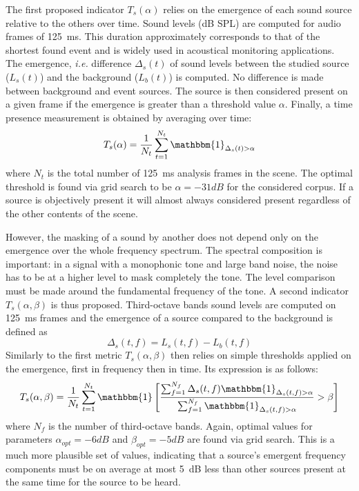 \documentclass{article}
\begin{document}
\begin{sloppy}
The first proposed indicator $T_s(\alpha)$ relies on the emergence of each sound source relative to the others over time. Sound levels (dB SPL) are computed for audio frames of 125~ms. This duration approximately corresponds to that of the shortest found event and is widely used in acoustical monitoring applications. The emergence, \textit{i.e.} difference $\Delta_s(t)$ of sound levels between the studied source ($L_s(t)$) and the background ($L_b(t)$) is computed. No difference is made between background and event sources. The source is then considered present on a given frame if the emergence is greater than a threshold value $\alpha$. Finally, a time presence measurement is obtained by averaging over time:
\begin{equation}
T_s(\alpha) = \frac{1}{N_t}\sum_{t = 1}^{N_t}\mathbbm{1}_{\Delta_s(t)>\alpha}
\end{equation}
where $N_t$ is the total number of 125~ms analysis frames in the scene. The optimal threshold is found via grid search to be $\alpha = -31dB$ for the considered corpus. If a source is objectively present it will almost always considered present regardless of the other contents of the scene.

However, the masking of a sound by another does not depend only on the emergence over the whole frequency spectrum. The spectral composition is important: in a signal with a monophonic tone and large band noise, the noise has to be at a higher level to mask completely the tone. The level comparison must be made around the fundamental frequency of the tone. A second indicator $T_s(\alpha, \beta)$ is thus proposed. Third-octave bands sound levels are computed on 125~ms frames and the emergence of a source compared to the background is defined as
\begin{equation}
\Delta_s(t, f) = L_s(t, f) - L_b(t, f)
\end{equation}
Similarly to the first metric $T_s(\alpha, \beta)$ then relies on simple thresholds applied on the emergence, first in frequency then in time. Its expression is as follows:
\begin{equation}
T_s(\alpha, \beta) = \frac{1}{N_t}\sum_{t = 1}^{N_t}\mathbbm{1}\left[ \frac{\sum_{f = 1}^{N_f}\Delta_s(t, f)\mathbbm{1}_{\Delta_s(t, f)>\alpha}}{\sum_{f = 1}^{N_f}\mathbbm{1}_{\Delta_s(t, f)>\alpha}}>\beta \right]
\end{equation}
where $N_f$ is the number of third-octave bands. Again, optimal values for parameters $\alpha_{opt} = -6 dB$ and $\beta_{opt} = -5 dB$ are found via grid search. This is a much more plausible set of values, indicating that a source's emergent frequency components must be on average at most 5~dB less than other sources present at the same time for the source to be heard.



\end{sloppy}
\end{document}
